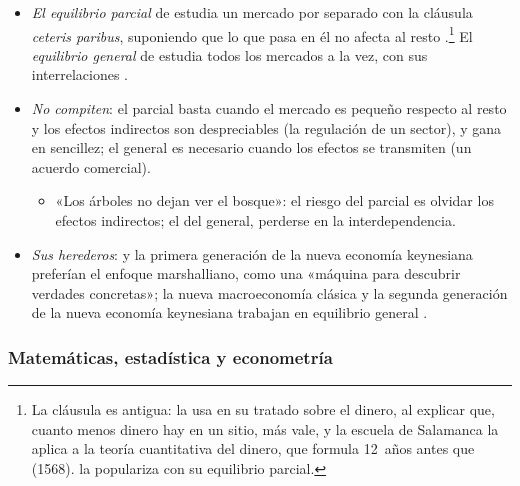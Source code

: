 \documentclass[11pt]{article}
\begin{document}
\begin{itemize}
\item \emph{El equilibrio parcial} de  estudia un mercado por separado con la cláusula \emph{ceteris paribus}, suponiendo que lo que pasa en él no afecta al resto .\footnote{La cláusula es antigua:  la usa en su tratado sobre el dinero\nocite{Molina1597Iustitia}, al explicar que, cuanto menos dinero hay en un sitio, más vale, y la escuela de Salamanca la aplica a la teoría cuantitativa del dinero, que  \parencite*{Azpilcueta1556Cambios} formula 12~años antes que  (1568).  la populariza con su equilibrio parcial.} El \emph{equilibrio general} de  estudia todos los mercados a la vez, con sus interrelaciones .
\item \emph{No compiten}: el parcial basta cuando el mercado es pequeño respecto al resto y los efectos indirectos son despreciables (la regulación de un sector), y gana en sencillez; el general es necesario cuando los efectos se transmiten (un acuerdo comercial).
  \begin{itemize}
  \item «Los árboles no dejan ver el bosque»: el riesgo del parcial es olvidar los efectos indirectos; el del general, perderse en la interdependencia.
  \end{itemize}
\item \emph{Sus herederos}:  y la primera generación de la nueva economía keynesiana preferían el enfoque marshalliano, como una «máquina para descubrir verdades concretas»\nocite{Friedman1949Marshallian}; la nueva macroeconomía clásica y la segunda generación de la nueva economía keynesiana trabajan en equilibrio general  .
\end{itemize}

\subsubsection{Matemáticas, estadística y econometría}\label{sec:matematicas-econometria}
\end{document}
